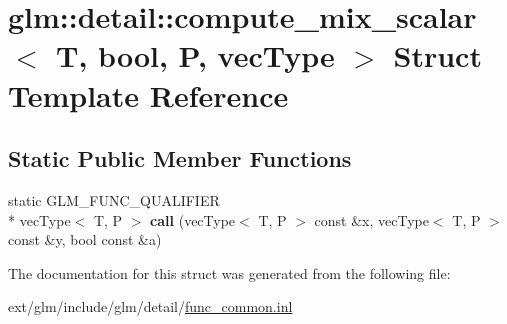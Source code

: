 \hypertarget{structglm_1_1detail_1_1compute__mix__scalar_3_01_t_00_01bool_00_01_p_00_01vec_type_01_4}{\section{glm\-:\-:detail\-:\-:compute\-\_\-mix\-\_\-scalar$<$ T, bool, P, vec\-Type $>$ Struct Template Reference}
\label{structglm_1_1detail_1_1compute__mix__scalar_3_01_t_00_01bool_00_01_p_00_01vec_type_01_4}
}
\subsection*{Static Public Member Functions}
\begin{DoxyCompactItemize}
\item 
\hypertarget{structglm_1_1detail_1_1compute__mix__scalar_3_01_t_00_01bool_00_01_p_00_01vec_type_01_4_a32b46dd2110b41d9c7b98fc90b9a88b1}{static G\-L\-M\-\_\-\-F\-U\-N\-C\-\_\-\-Q\-U\-A\-L\-I\-F\-I\-E\-R \\*
vec\-Type$<$ T, P $>$ {\bfseries call} (vec\-Type$<$ T, P $>$ const \&x, vec\-Type$<$ T, P $>$ const \&y, bool const \&a)}\label{structglm_1_1detail_1_1compute__mix__scalar_3_01_t_00_01bool_00_01_p_00_01vec_type_01_4_a32b46dd2110b41d9c7b98fc90b9a88b1}

\end{DoxyCompactItemize}


The documentation for this struct was generated from the following file\-:\begin{DoxyCompactItemize}
\item 
ext/glm/include/glm/detail/\hyperlink{func__common_8inl}{func\-\_\-common.\-inl}\end{DoxyCompactItemize}
